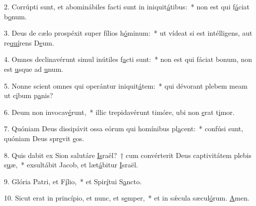 2. Corrúpti sunt, et abominábiles facti sunt in iniquit\uline{á}tibus:~* non est qui f\uline{á}ciat b\uline{o}num.\par 
3. Deus de cælo prospéxit super fílios h\uline{ó}minum:~* ut vídeat si est intélligens, aut re\uline{quí}rens D\uline{e}um.\par 
4. Omnes declinavérunt simul inútiles f\uline{a}cti sunt:~* non est qui fáciat bonum, non est \uline{u}sque ad \uline{u}num.\par 
5. Nonne scient omnes qui operántur iniquit\uline{á}tem:~* qui dévorant plebem meam ut c\uline{i}bum p\uline{a}nis?\par 
6. Deum non invocav\uline{é}runt,~* illic trepidavérunt timóre, ubi non \uline{e}rat t\uline{i}mor.\par 
7. Quóniam Deus dissipávit ossa eórum qui homínibus pl\uline{a}cent:~* confúsi sunt, quóniam Deus spr\uline{e}vit \uline{e}os.\par 
8. Quis dabit ex Sion salutáre \uline{Is}raël?~† cum convérterit Deus captivitátem plebis s\uline{u}æ,~* exsultábit Jacob, et læt\uline{á}bitur \uline{I}sraël.\par 
9. Glória Patri, et F\uline{í}lio,~* et Spir\uline{í}tui S\uline{a}ncto.\par 
10. Sicut erat in princípio, et nunc, et s\uline{e}mper,~* et in sǽcula sæcul\uline{ó}rum. \uline{A}men.\par 
